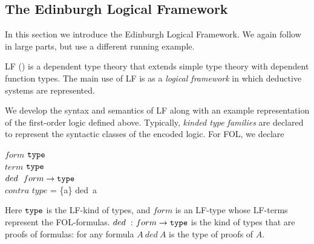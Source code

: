 \documentclass{article}
\begin{document}
\subsection{The Edinburgh Logical Framework}
In this section we introduce the Edinburgh Logical Framework\cite{lf}. We again follow \cite{FOLsound} in large parts, but use a different running example.

LF (\cite{lf}) is a dependent type theory that extends simple type theory with dependent function types. The main use of LF is as a \emph{logical framework} in which deductive systems are represented.

We develop the syntax and semantics of LF along with an example representation of the first-order logic defined above. 
Typically, \emph{kinded type families} are declared to represent the syntactic classes of the encoded logic. For FOL, we declare
\begin{twelfsig}
$form$ \tcolon $\mathtt{type}$ \\
$term$ 	\tcolon $\mathtt{type}$\\
$\mathop{ded\,}$ \tcolon $form\rightarrow\mathtt{type}$ \\
$contra$ \tcolon $type$ = \{a\} ded\ a \\
\end{twelfsig}

Here $\mathtt{type}$ is the LF-kind of types, and $form$ is an LF-type whose LF-terms represent the FOL-formulas. $\mathop{ded\,}$ : $form\rightarrow\mathtt{type}$ is the kind of types that are proofs of formulas: for any formula $A\ ded\ A$ is the type of proofs of $A$.
\end{document}
